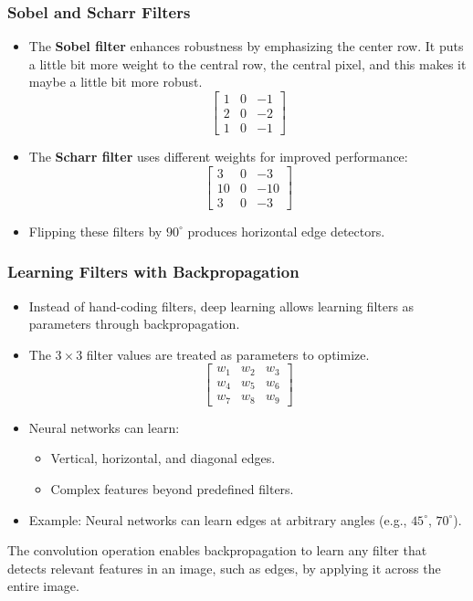 \documentclass[letterpaper,12pt,notitlepage,twoside]{report}
\begin{document}
\subsubsection{Sobel and Scharr Filters}
\begin{itemize}
    \item The \textbf{Sobel filter} enhances robustness by emphasizing the center row.  It puts a little bit more weight to the central row, the central pixel, and this makes it maybe a little bit more robust.
    \[
    \begin{bmatrix}
    1 & 0 & -1 \\
    2 & 0 & -2 \\
    1 & 0 & -1
    \end{bmatrix}
    \]
    \item The \textbf{Scharr filter} uses different weights for improved performance:
    \[
    \begin{bmatrix}
    3 & 0 & -3 \\
    10 & 0 & -10 \\
    3 & 0 & -3
    \end{bmatrix}
    \]
    \item Flipping these filters by $90^\circ$ produces horizontal edge detectors.
\end{itemize}

\subsubsection*{Learning Filters with Backpropagation}
\begin{itemize}
    \item Instead of hand-coding filters, deep learning allows learning filters as parameters through backpropagation.
    \item The $3 \times 3$ filter values are treated as parameters to optimize.
    \[
    \begin{bmatrix}
    w_1 & w_2 & w_3 \\
    w_4 & w_5 & w_6 \\
    w_7 & w_8 & w_9
    \end{bmatrix}
    \]
    \item Neural networks can learn:
    \begin{itemize}
        \item Vertical, horizontal, and diagonal edges.
        \item Complex features beyond predefined filters.
    \end{itemize}
    \item Example: Neural networks can learn edges at arbitrary angles (e.g., $45^\circ$, $70^\circ$).
\end{itemize}
The convolution operation enables backpropagation to learn any filter that detects relevant features in an image, such as edges, by applying it across the entire image.
\end{document}
